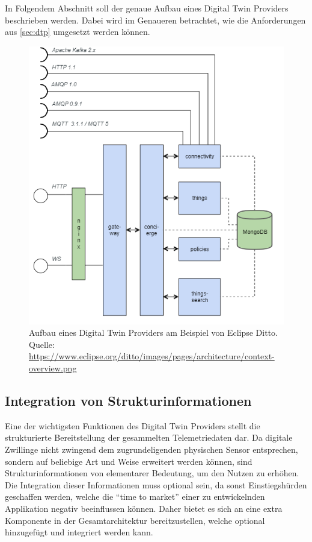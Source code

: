 In Folgendem Abschnitt soll der genaue Aufbau eines Digital Twin Providers beschrieben werden. Dabei wird im Genaueren betrachtet, wie die Anforderungen aus \vref{sec:dtp} umgesetzt werden können.

\begin{figure}
    \centering
    \includegraphics[width=0.8\linewidth]{img/ditto_arch.png}
    \caption[Aufbau eines Digital Twin Providers]{Aufbau eines Digital Twin Providers am Beispiel von Eclipse Ditto.\\Quelle: \url{https://www.eclipse.org/ditto/images/pages/architecture/context-overview.png}}
    \label{fig:ditto_arch}
\end{figure}

\subsection*{Integration von Strukturinformationen}
Eine der wichtigsten Funktionen des Digital Twin Providers stellt die strukturierte Bereitstellung der gesammelten Telemetriedaten dar. Da digitale Zwillinge nicht zwingend dem zugrundeligenden physischen Sensor entsprechen, sondern auf beliebige Art und Weise erweitert werden können, sind Strukturinformationen von elementarer Bedeutung, um den Nutzen zu erhöhen. Die Integration dieser Informationen muss optional sein, da sonst Einstiegshürden geschaffen werden, welche die \enquote{time to market} einer zu entwickelnden Applikation negativ beeinflussen können. Daher bietet es sich an eine extra Komponente in der Gesamtarchitektur bereitzustellen, welche optional hinzugefügt und integriert werden kann.

